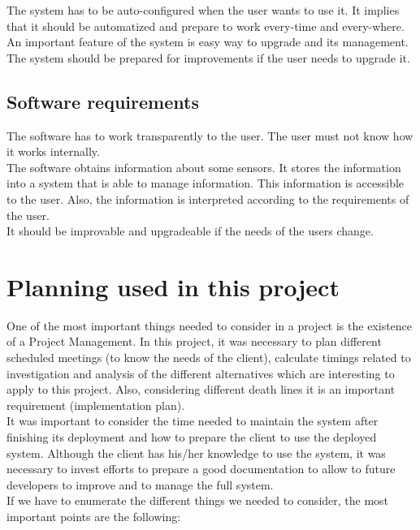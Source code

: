 The system has to be auto-configured when the user wants to use it. It implies that it should be automatized and prepare to work every-time and every-where.\\

An important feature of the system is easy way to upgrade and its management. The system should be prepared for improvements if the user needs to upgrade it.

\subsection{Software requirements}

The software has to work transparently to the user. The user must not know how it works internally.\\

The software obtains information about some sensors. It stores the information into a system that is able to manage information. This information is accessible to the user. Also, the information is interpreted according to the requirements of the user.\\

It should be improvable and upgradeable if the needs of the users change.

\section{Planning used in this project}

One of the most important things needed to consider in a project is the existence of a Project Management. In this project, it was necessary to plan different scheduled meetings (to know the needs of the client), calculate timings related to investigation and analysis of the different alternatives which are interesting to apply to this project. Also, considering different death lines it is an important requirement (implementation plan).\\

It was important to consider the time needed to maintain the system after finishing its deployment and how to prepare the client to use the deployed system. Although the client has his/her knowledge to use the system, it was necessary to invest  efforts to prepare a good documentation to allow to future developers to improve and to manage the full system.\\

If we have to enumerate the different things we needed to consider, the most important points are the following:

